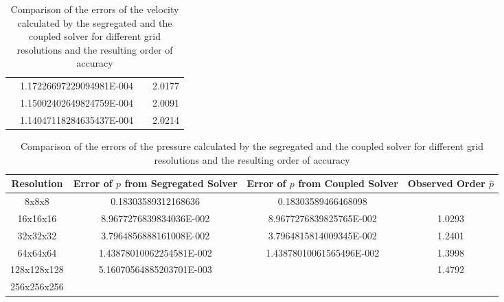 \begin{table}[h!]
\begin{tabular}{cccc}
    \rowcolor{black!00}\multirow{3}{*}{}             & 1.17226697229094981E-004 & & 2.0177  \\
    \rowcolor{black!00}                              & 1.15002402649824759E-004 & & 2.0091  \\
    \rowcolor{black!00} \multirow{-3}{*}{256x256x256}& 1.14047118284635437E-004 & & 2.0214  \\ %
  \end{tabular}
  \caption{Comparison of the errors of the velocity calculated by the segregated and the coupled solver for different grid resolutions and the resulting order of accuracy}
\end{table}

\begin{table}[h!]\centering
{}
  \begin{tabular}{cccc}\toprule
    Resolution & Error of \(p\) from Segregated Solver & Error of \(p\) from Coupled Solver & Observed Order \(\hat{p}\) \\
    \midrule
    \rowcolor{black!20} 8x8x8       & 0.18303589312168636      &  0.18303589466468098      &        \\%
    \rowcolor{black!00} 16x16x16    & 8.9677276839834036E-002  &  8.9677276839825765E-002  & 1.0293 \\%
    \rowcolor{black!20} 32x32x32    & 3.7964856888161008E-002  &  3.7964815814009345E-002  & 1.2401 \\%
    \rowcolor{black!00} 64x64x64    & 1.43878010062254581E-002 &  1.43878010061565496E-002 & 1.3998 \\%
    \rowcolor{black!20} 128x128x128 & 5.16070564885203701E-003 &                           & 1.4792 \\%
    \rowcolor{black!00} 256x256x256 &                          &                           &        \\%
  \end{tabular}
  \caption{Comparison of the errors of the pressure calculated by the segregated and the coupled solver for different grid resolutions and the resulting order of accuracy}
\end{table}

